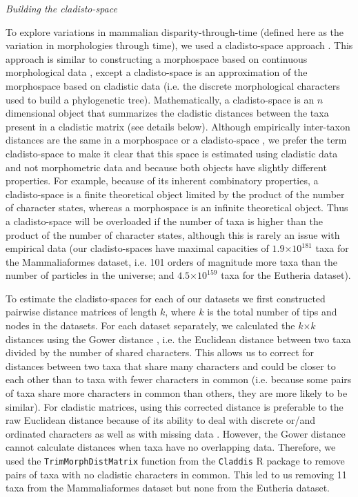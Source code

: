 \documentclass[12pt,letterpaper]{article}
\renewcommand{\subsection}[1]{%
\bigskip
\begin{center}
\begin{large}
\normalfont\itshape #1
\end{large}
\end{center}}
\begin{document}
\subsection{Building the cladisto-space}
To explore variations in mammalian disparity-through-time (defined here as the variation in morphologies through time), we used a cladisto-space approach \citep[e.g.][]{Foote01071994,Foote29111996,Wesley-Hunt2005,Brusatte12092008,friedmanexplosive2010,toljagictriassic-jurassic2013,Hughes20082013}.
This approach is similar to constructing a morphospace based on continuous morphological data \citep[e.g.][]{friedmanexplosive2010}, except a cladisto-space is an approximation of the morphospace based on cladistic data (i.e. the discrete morphological characters used to build a phylogenetic tree).
Mathematically, a cladisto-space is an $n$ dimensional object that summarizes the cladistic distances between the taxa present in a cladistic matrix (see details below).
Although empirically inter-taxon distances are the same in a morphospace or a cladisto-space \citep{foth2012different,hetherington2015cladistic}, we prefer the term cladisto-space to make it clear that this space is estimated using cladistic data and not morphometric data and because both objects have slightly different properties.
For example, because of its inherent combinatory properties, a cladisto-space is a finite theoretical object limited by the product of the number of character states, whereas a morphospace is an infinite theoretical object.
Thus a cladisto-space will be overloaded if the number of taxa is higher than the product of the number of character states, although this is rarely an issue with empirical data (our cladisto-spaces have maximal capacities of $1.9$$\times$$10^{181}$ taxa for the Mammaliaformes dataset, i.e. 101 orders of magnitude more taxa than the number of particles in the universe; and $4.5$$\times$$10^{159}$ taxa for the Eutheria dataset).

To estimate the cladisto-spaces for each of our datasets we first constructed pairwise distance matrices of length $k$, where $k$ is the total number of tips and nodes in the datasets.
For each dataset separately, we calculated the $k$$\times$$k$ distances using the Gower distance \citep{Gower71}, i.e. the Euclidean distance between two taxa divided by the number of shared characters. 
This allows us to correct for distances between two taxa that share many characters and could be closer to each other than to taxa with fewer characters in common (i.e. because some pairs of taxa share more characters in common than others, they are more likely to be similar).
For cladistic matrices, using this corrected distance is preferable to the raw Euclidean distance because of its ability to deal with discrete or/and ordinated characters as well as with missing data \citep{anderson2012using}.
However, the Gower distance cannot calculate distances when taxa have no overlapping data.
Therefore, we used the \texttt{TrimMorphDistMatrix} function from the \texttt{Claddis} R package \citep{Claddis} to remove pairs of taxa with no cladistic characters in common.
This led to us removing 11 taxa from the Mammaliaformes dataset but none from the Eutheria dataset.
\end{document}
